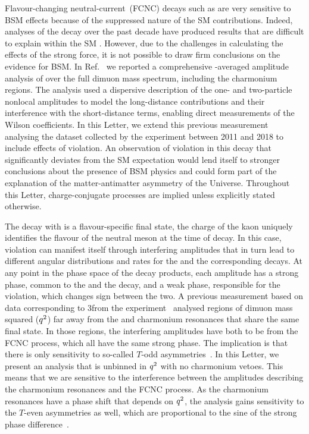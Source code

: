 Flavour-changing neutral-current~(FCNC) decays such as \BdbToKstbMuMu are very sensitive to BSM effects because of the suppressed nature of the SM contributions. Indeed, analyses of the decay over the past decade have produced results that are difficult to explain within the SM \cite{LHCb-PAPER-2025-041,CMS:2024atz}. However, due to the challenges in calculating the effects of the strong force, it is not possible to draw firm conclusions on the evidence for BSM. In Ref.~\cite{LHCb-PAPER-2024-011} we reported a comprehensive \CP-averaged amplitude analysis of \BdbToKstbMuMu over the full dimuon mass spectrum, including the charmonium regions. The analysis used a dispersive description of the one- and two-particle nonlocal amplitudes to model the long-distance contributions and their interference with the short-distance terms, enabling direct measurements of the Wilson coefficients.
In this Letter, we extend this previous measurement analysing the dataset collected by the \lhcb experiment between 2011 and 2018 to include effects of \CP violation. An observation of \CP violation in this decay that significantly deviates from the SM expectation would lend itself to stronger conclusions about the presence of BSM physics and could form part of the explanation of the matter-antimatter asymmetry of the Universe. Throughout this Letter, charge-conjugate processes are implied unless explicitly stated otherwise.

The \BdbToKstbMuMu decay with \decay{\Kstarzb}{\Km\pip} is a flavour-specific final state, \ie the charge of the kaon uniquely identifies the flavour of the neutral \B meson at the time of decay. In this case, \CP violation can manifest itself through interfering amplitudes that in turn lead to different angular distributions and rates for the \Bdb and the corresponding \Bd decays. At any point in the phase space of the decay products, each amplitude has a strong phase, common to  the \Bdb and the \Bd decay, and a weak phase, responsible for the \CP violation, which changes sign between the two. A previous measurement based on data corresponding to 3\invfb from the \lhcb experiment~\cite{LHCb-PAPER-2014-032} analysed regions of dimuon mass squared (${q^2}$) far away from the \jpsi and \psitwos charmonium resonances that share the same final state. In those regions, the interfering amplitudes have both to be from the FCNC process, which all have the same strong phase. The implication is that there is only sensitivity to so-called $T$-odd asymmetries~\cite{Bobeth:2008ij}. In this Letter, we present an analysis that is unbinned in ${q^2}$ with no charmonium vetoes. This means that we are sensitive to the interference between
the amplitudes describing the charmonium resonances and the FCNC process. As the charmonium resonances have a phase shift that depends on ${q^2}$, the analysis gains sensitivity to the
$T$-even asymmetries as well, which are proportional to the sine of the strong phase difference~\cite{Blake:2017fyh}.

